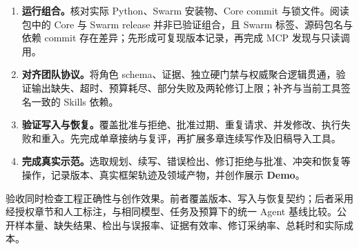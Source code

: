 \begin{enumerate}
  \item \textbf{运行组合。}核对实际 Python、Swarm 安装物、Core commit 与锁文件。阅读包中的 Core 与 Swarm release 并非已验证组合，且 Swarm 标签、源码包名与依赖 commit 存在差异；先形成可复现版本记录，再完成 MCP 发现与只读调用。
  \item \textbf{对齐团队协议。}将角色 schema、证据、独立硬门禁与权威聚合逻辑贯通，验证输出缺失、超时、预算耗尽、部分失败及两轮修订上限；补齐与当前工具签名一致的 Skills 依赖。
  \item \textbf{验证写入与恢复。}覆盖批准与拒绝、批准过期、重复请求、并发修改、执行失败和重入。先完成单章接纳与复评，再扩展多章连续写作及旧稿导入工具。
  \item \textbf{完成真实示范。}选取规划、续写、错误检出、修订拒绝与批准、冲突和恢复等操作，记录版本、真实框架轨迹及领域产物，并创作展示 \textbf{Demo}。
\end{enumerate}

验收同时检查工程正确性与创作效果。前者覆盖版本、写入与恢复契约；后者采用经授权章节和人工标注，与相同模型、任务及预算下的统一 Agent 基线比较。公开样本量、缺失结果、检出与误报率、证据有效率、修订采纳率、总耗时和实际成本。
